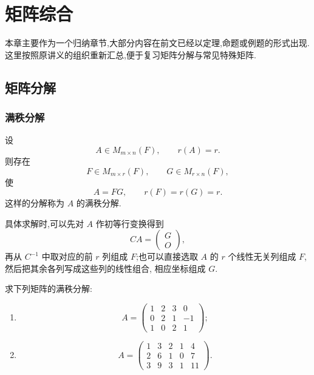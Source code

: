 \setcounter{chapter}{8}
\pagestyle{fancy}

\chapter{矩阵综合}

本章主要作为一个归纳章节,大部分内容在前文已经以定理,命题或例题的形式出现.
这里按照原讲义的组织重新汇总,便于复习矩阵分解与常见特殊矩阵.


\section{矩阵分解}

\subsection{满秩分解}

\begin{theorem}[\markstar]
设
\[
A\in M_{m\times n}(F),
\qquad
r(A)=r.
\]
则存在
\[
F\in M_{m\times r}(F),
\qquad
G\in M_{r\times n}(F),
\]
使
\[
A=FG,
\qquad
r(F)=r(G)=r.
\]
这样的分解称为 $A$ 的满秩分解.
\end{theorem}

具体求解时,可以先对 $A$ 作初等行变换得到
\[
CA=
\begin{pmatrix}
G\\
O
\end{pmatrix},
\]
再从 $C^{-1}$ 中取对应的前 $r$ 列组成 $F$;也可以直接选取 $A$ 的
$r$ 个线性无关列组成 $F$,然后把其余各列写成这些列的线性组合,
相应坐标组成 $G$.


\begin{example}
求下列矩阵的满秩分解:
\begin{enumerate}
    \item
    \[
    A=
    \begin{pmatrix}
    1&2&3&0\\
    0&2&1&-1\\
    1&0&2&1
    \end{pmatrix};
    \]
    \item
    \[
    A=
    \begin{pmatrix}
    1&3&2&1&4\\
    2&6&1&0&7\\
    3&9&3&1&11
    \end{pmatrix}.
    \]
\end{enumerate}
\end{example}
\exampleblank

